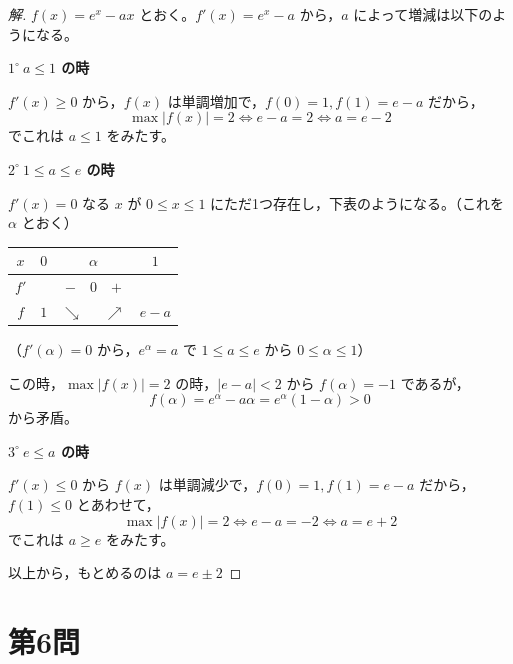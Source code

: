 \documentclass[../main.tex]{subfiles}
\begin{document}
\begin{proof}[解]
  $f(x)=e^x-ax$ とおく。$f'(x)=e^x-a$ から，$a$ によって増減は以下のようになる。

  \textbf{$1^\circ\ a\le1$ の時}

  $f'(x)\ge0$ から，$f(x)$ は単調増加で，$f(0)=1,f(1)=e-a$ だから，
  \[
    \max|f(x)|=2 \iff e-a=2 \iff a=e-2
  \]
  でこれは $a\le1$ をみたす。

  \textbf{$2^\circ\ 1\le a\le e$ の時}

  $f'(x)=0$ なる $x$ が $0\le x\le1$ にただ1つ存在し，下表のようになる。（これを $\alpha$ とおく）

  \begin{center}
    \begin{tabular}{c|c|c|c}
      $x$ & $0$ & $\alpha$ & $1$ \\
      \hline
      $f'$ & & $-$\ \ $0$\ \ $+$ & \\
      \hline
      $f$ & $1$ & $\searrow$\ \ \ $\nearrow$ & $e-a$
    \end{tabular}
  \end{center}
  （$f'(\alpha)=0$ から，$e^\alpha=a$ で $1\le a\le e$ から $0\le\alpha\le1$）

  この時，$\max|f(x)|=2$ の時，$|e-a|<2$ から $f(\alpha)=-1$ であるが，
  \[
    f(\alpha)=e^\alpha-a\alpha=e^\alpha(1-\alpha)>0
  \]
  から矛盾。

  \textbf{$3^\circ\ e\le a$ の時}

  $f'(x)\le0$ から $f(x)$ は単調減少で，$f(0)=1,f(1)=e-a$ だから，$f(1)\le0$ とあわせて，
  \[
    \max|f(x)|=2\iff e-a=-2\iff a=e+2
  \]
  でこれは $a\ge e$ をみたす。

  以上から，もとめるのは $a=e\pm2$
\end{proof}

\newpage

\section*{第6問}
\end{document}
